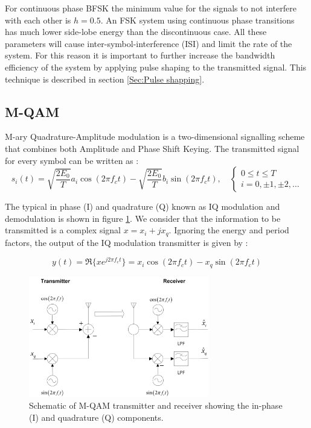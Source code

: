 \documentclass[12pt,a4paper,openright]{report}
\begin{document}
For continuous phase BFSK the minimum value for the signals to not interfere with each other is $h=0.5$. An FSK system using continuous phase transitions has much lower side-lobe energy than the discontinuous case. All these parameters will cause inter-symbol-interference (ISI) and limit the rate of the system. For this reason it is important to further increase the bandwidth efficiency of the system by applying pulse shaping to the transmitted signal. This technique is described in section \ref{Sec:Pulse shapping}. 



\subsection{M-QAM}
M-ary Quadrature-Amplitude modulation is a two-dimensional signalling scheme that combines both Amplitude and Phase Shift Keying. The transmitted signal for every symbol can be written as \cite{Proakis}:
\begin{equation}\label{Eq: MQAM symbols}
{s_i}\left( t \right) = \sqrt {\frac{{2{E_0}}}{T}} {a_i}\cos \left( {2\pi {f_c}t} \right) - \sqrt {\frac{{2{E_0}}}{T}} {b_i}\sin\left( {2\pi {f_c}t} \right), \quad \left\{ {\begin{array}{*{20}{c}}
{0 \le t \le T}\\
{i = 0, \pm 1, \pm 2, \ldots }
\end{array}} \right.
\end{equation}

The typical in phase (I) and quadrature (Q) known as IQ modulation and demodulation is shown in figure \ref{fig:iqmodem}. We consider that the information to be transmitted is a complex signal $x=x_i+jx_q$. Ignoring the energy and period factors, the output of the IQ modulation transmitter is given by \cite{Madhow}:

\begin{equation}\label{EQ: MQAM IQ}
y(t) = \Re \{ x{e^{j2\pi {f_c}t}}\}  = {x_i}\cos (2\pi {f_c}t) - {x_q}\sin (2\pi {f_c}t)
\end{equation}

 \begin{figure}[H]
  \centering
    \includegraphics[width=0.7\textwidth]{MQAMsyst.png}
    \caption[Schematic of M-QAM transmitter and receiver]{Schematic of M-QAM transmitter and receiver showing the in-phase (I) and quadrature (Q) components.}
    \label{fig:iqmodem}
\end{figure}
\end{document}
